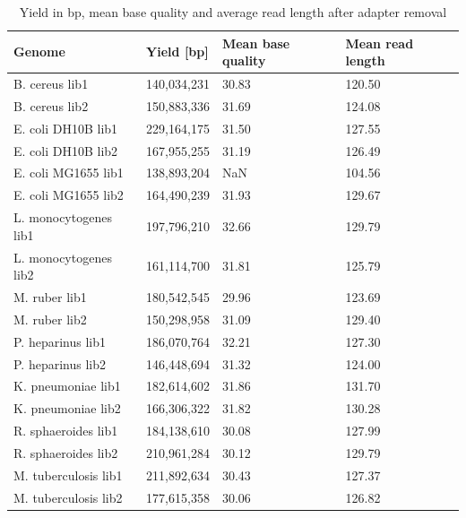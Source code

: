 \documentclass[fleqn,10pt]{wlpeerj}
\begin{document}
\begin{table}[]
\begin{center}
{
{\begin{tabular}{llll}\hline
Genome & Yield [bp] & Mean base quality & Mean read length \\\midrule
B. cereus lib1 & 140,034,231 & 30.83 & 120.50  \\
B. cereus lib2 & 150,883,336 & 31.69 & 124.08  \\
E. coli DH10B lib1 & 229,164,175 & 31.50 & 127.55 \\
E. coli DH10B lib2 & 167,955,255 & 31.19 & 126.49 \\
E. coli MG1655 lib1 & 138,893,204 & NaN & 104.56 \\
E. coli MG1655 lib2 & 164,490,239 & 31.93 & 129.67 \\
L. monocytogenes lib1 & 197,796,210 & 32.66 & 129.79 \\
L. monocytogenes lib2 & 161,114,700 & 31.81 & 125.79 \\
M. ruber lib1 & 180,542,545 & 29.96 & 123.69 \\
M. ruber lib2 & 150,298,958 & 31.09 & 129.40 \\
P. heparinus lib1 & 186,070,764 & 32.21 & 127.30 \\
P. heparinus lib2 & 146,448,694 & 31.32 & 124.00 \\
K. pneumoniae lib1 & 182,614,602 & 31.86 & 131.70 \\
K. pneumoniae lib2 & 166,306,322 & 31.82 & 130.28 \\
R. sphaeroides lib1 & 184,138,610 & 30.08 & 127.99 \\
R. sphaeroides lib2 & 210,961,284 & 30.12 & 129.79 \\
M. tuberculosis lib1 & 211,892,634 & 30.43 & 127.37 \\
M. tuberculosis lib2 & 177,615,358 & 30.06 & 126.82 \\\hline
\end{tabular}}{}
}
\end{center}
\caption{Yield in bp, mean base quality and average read length after adapter removal \label{tab:yield}}
\end{table}  
\end{document}
